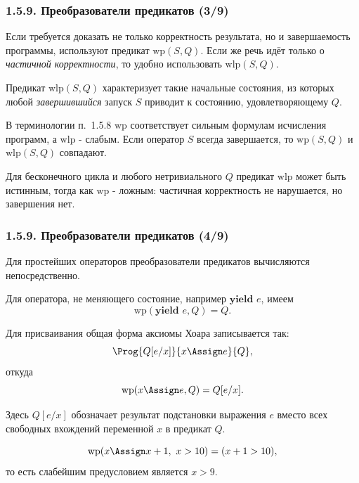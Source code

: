 \begin{frame}
\frametitle{1.5.9. Преобразователи предикатов (3/9)}

Если требуется доказать не только корректность результата,
но и завершаемость программы, используют предикат
$\mathrm{wp}(S,Q)$.
Если же речь идёт только о \emph{частичной корректности},
то удобно использовать
$\mathrm{wlp}(S,Q)$.

\smallskip
Предикат $\mathrm{wlp}(S,Q)$ характеризует такие начальные состояния,
из которых любой \emph{завершившийся} запуск $S$ приводит к состоянию,
удовлетворяющему $Q$.

\begin{remark}
В терминологии п.~1.5.8
$\mathrm{wp}$ соответствует сильным формулам исчисления программ,
а $\mathrm{wlp}$ - слабым.
Если оператор $S$ всегда завершается,
то $\mathrm{wp}(S,Q)$ и $\mathrm{wlp}(S,Q)$ совпадают.
\end{remark}

\begin{example}
Для бесконечного цикла и любого нетривиального $Q$
предикат $\mathrm{wlp}$ может быть истинным,
тогда как $\mathrm{wp}$ - ложным:
частичная корректность не нарушается,
но завершения нет.
\end{example}

\end{frame}

\begin{frame}
\frametitle{1.5.9. Преобразователи предикатов (4/9)}

Для простейших операторов преобразователи предикатов
вычисляются непосредственно.

\smallskip
Для оператора, не меняющего состояние,
например $\textbf{yield }e$, имеем
\[
\mathrm{wp}(\textbf{yield }e, Q)=Q.
\]

Для присваивания общая форма аксиомы Хоара записывается так:
\[
\Prog{Q[e/x]}{x \Assign e}{Q},
\]
откуда
\[
\mathrm{wp}(x \Assign e, Q)=Q[e/x].
\]

Здесь $Q[e/x]$ обозначает результат подстановки
выражения $e$ вместо всех свободных вхождений переменной $x$
в предикат $Q$.

\begin{example}
\[
\mathrm{wp}(x \Assign x+1,\ x>10)=(x+1>10),
\]
то есть слабейшим предусловием является $x>9$.
\end{example}

\end{frame}

